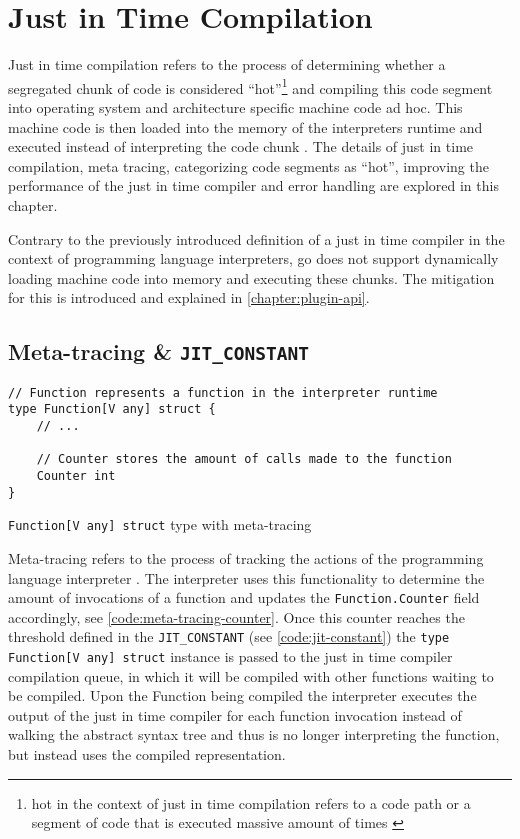 \chapter{Just in Time Compilation}

Just in time compilation refers to the process of determining whether a
segregated chunk of code is considered ``hot''\footnote{hot in the context of
just in time compilation refers to a code path or a segment of code that is
executed massive amount of times \cite{jvm_ibm_optlevel, jvm_efficient}} and
compiling this code segment into operating system and architecture specific
machine code ad hoc. This machine code is then loaded into the memory of the
interpreters runtime and executed instead of interpreting the code chunk
\cite{jvm_efficient}. The details of just in time compilation, meta tracing,
categorizing code segments as ``hot'', improving the performance of the just in
time compiler and error handling are explored in this chapter.

Contrary to the previously introduced definition of a just in time
compiler in the context of programming language interpreters, go does
not support dynamically loading machine code into memory and executing
these chunks. The mitigation for this is introduced and explained in
\autoref{chapter:plugin-api}.

\section{Meta-tracing \& \texttt{JIT\_CONSTANT}}

\begin{listing}[H]
    \begin{verbatim}
// Function represents a function in the interpreter runtime
type Function[V any] struct {
    // ...

    // Counter stores the amount of calls made to the function
    Counter int
}
    \end{verbatim}
    \caption{\texttt{Function[V any] struct} type with meta-tracing}
    \label{code:meta-tracing-counter}
\end{listing}

Meta-tracing refers to the process of tracking the actions of the programming
language interpreter \cite[4.1 Meta-tracing]{bolz2015impact}. The interpreter
uses this functionality to determine the amount of invocations of a function
and updates the \texttt{Function.Counter} field accordingly, see
\autoref{code:meta-tracing-counter}. Once this counter reaches the threshold
defined in the \texttt{JIT\_CONSTANT} (see \autoref{code:jit-constant}) the
\texttt{type Function[V any] struct} instance is passed to the just in
time compiler compilation queue, in which it will be compiled with other
functions waiting to be compiled. Upon the Function being compiled the
interpreter executes the output of the just in time compiler for each function
invocation instead of walking the abstract syntax tree and thus is no longer
interpreting the function, but instead uses the compiled representation.

